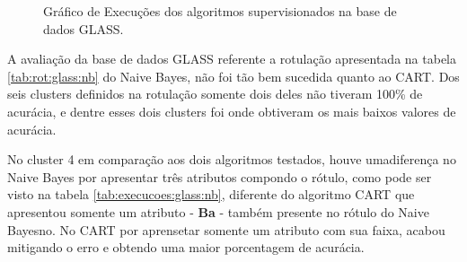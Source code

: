 \begin{figure}[h!]
    \centering
    \quad
    
    \caption{Gráfico de Execuções dos algoritmos supervisionados na base de dados GLASS.} \label{fig:graf:GLASS_NB_CART}
        
\end{figure}

A avaliação da base de dados GLASS referente a rotulação apresentada na tabela \ref{tab:rot:glass:nb} do Naive Bayes, não foi tão bem sucedida quanto ao CART. Dos seis clusters definidos na rotulação somente dois deles não tiveram 100\% de acurácia, e dentre esses dois clusters foi onde obtiveram os mais baixos valores de acurácia.

No cluster 4 em comparação aos dois algoritmos testados, houve umadiferença no Naive Bayes por apresentar três atributos compondo o rótulo, como pode ser visto na tabela \ref{tab:execucoes:glass:nb}, diferente do algoritmo CART que apresentou somente um atributo - \textbf{Ba} - também presente no rótulo do Naive Bayesno. No CART por aprensetar somente um atributo com sua faixa, acabou mitigando o erro e obtendo uma maior porcentagem de acurácia.

